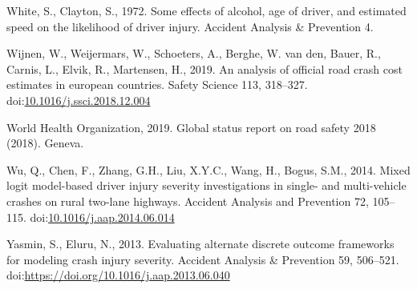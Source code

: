 \documentclass[]{elsarticle} %
\begin{document}
\leavevmode\hypertarget{ref-White1972effects}{}%
White, S., Clayton, S., 1972. Some effects of alcohol, age of driver,
and estimated speed on the likelihood of driver injury. Accident
Analysis \& Prevention 4.

\leavevmode\hypertarget{ref-Wijnen2019analysis}{}%
Wijnen, W., Weijermars, W., Schoeters, A., Berghe, W. van den, Bauer,
R., Carnis, L., Elvik, R., Martensen, H., 2019. An analysis of official
road crash cost estimates in european countries. Safety Science 113,
318--327.
doi:\href{https://doi.org/10.1016/j.ssci.2018.12.004}{10.1016/j.ssci.2018.12.004}

\leavevmode\hypertarget{ref-WHO2019global}{}%
World Health Organization, 2019. Global status report on road safety
2018 (2018). Geneva.

\leavevmode\hypertarget{ref-Wu2014mixed}{}%
Wu, Q., Chen, F., Zhang, G.H., Liu, X.Y.C., Wang, H., Bogus, S.M., 2014.
Mixed logit model-based driver injury severity investigations in single-
and multi-vehicle crashes on rural two-lane highways. Accident Analysis
and Prevention 72, 105--115.
doi:\href{https://doi.org/10.1016/j.aap.2014.06.014}{10.1016/j.aap.2014.06.014}

\leavevmode\hypertarget{ref-Shamsunnahar2013evaluating}{}%
Yasmin, S., Eluru, N., 2013. Evaluating alternate discrete outcome
frameworks for modeling crash injury severity. Accident Analysis \&
Prevention 59, 506--521.
doi:\href{https://doi.org/https://doi.org/10.1016/j.aap.2013.06.040}{https://doi.org/10.1016/j.aap.2013.06.040}
\end{document}
